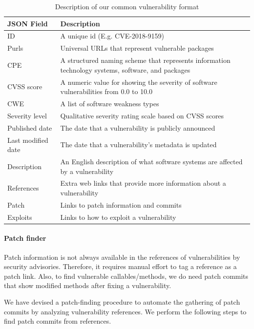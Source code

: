 \begin{table}
    \centering
    \caption{Description of our common vulnerability format}
	\label{ch3:tab:vuln_object}
 	\begin{tabular}{@{}lp{10cm}@{}} 
				\toprule
				\textbf{JSON Field} & \textbf{Description}  \\
				\midrule
				ID  & A unique id (E.g. CVE-2018-9159)   \\
				Purls & Universal URLs that represent vulnerable packages~\cite{purl} \\
				CPE & A structured naming scheme that represents information technology systems, software, and packages~\cite{cpe}  \\
				CVSS score & A numeric value for showing the severity of software vulnerabilities from 0.0 to 10.0~\cite{cvss} \\
				CWE &  A list of software weakness types~\cite{cwe} \\
				Severity level &  Qualitative severity rating scale based on CVSS scores~\cite{cvss} \\
				Published date & The date that a vulnerability is publicly announced \\
				Last modified date & The date that a vulnerability's metadata is updated \\
				Description &  An English description of  what software systems are affected by a vulnerability \\
				References & Extra web links that provide more information about a vulnerability \\
				Patch & Links to patch information and commits \\
				Exploits & Links to how to exploit a vulnerability \\
    \bottomrule
		\end{tabular}
\end{table}

\paragraph{Patch finder}
Patch information is not always available in the references of vulnerabilities by security advisories.
Therefore, it requires manual effort to tag a reference as a patch link. Also, to find vulnerable callables/methods, we do need patch commits that show modified methods after fixing a vulnerability.

We have devised a patch-finding procedure to automate the gathering of patch commits by analyzing vulnerability references. 
We perform the following steps to find patch commits from references.

